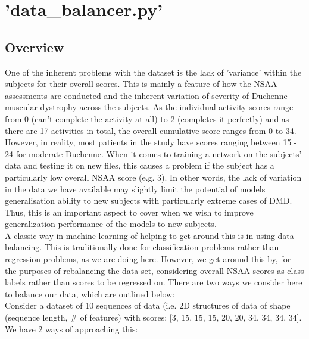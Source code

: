 \documentclass[12pt,twoside]{report}
\begin{document}
\section{'data\_balancer.py'}

\subsection{Overview}

\quad One of the inherent problems with the dataset is the lack of 'variance' within the subjects for their overall scores. This is mainly a feature of how the NSAA assessments are conducted and the inherent variation of severity of Duchenne muscular dystrophy across the subjects. As the individual activity scores range from 0 (can't complete the activity at all) to 2 (completes it perfectly) and as there are 17 activities in total, the overall cumulative score ranges from 0 to 34. However, in reality, most patients in the study have scores ranging between 15 - 24 for moderate Duchenne. When it comes to training a network on the subjects' data and testing it on new files, this causes a problem if the subject has a particularly low overall NSAA score (e.g. 3). In other words, the lack of variation in the data we have available may slightly limit the potential of models generalisation ability to new subjects with particularly extreme cases of DMD. Thus, this is an important aspect to cover when we wish to improve generalization performance of the models to new subjects.\\

\quad A classic way in machine learning of helping to get around this is in using data balancing. This is traditionally done for classification problems rather than regression problems, as we are doing here. However, we get around this by, for the purposes of rebalancing the data set, considering overall NSAA scores as class labels rather than scores to be regressed on. There are two ways we consider here to balance our data, which are outlined below:\\

\quad Consider a dataset of 10 sequences of data (i.e. 2D structures of data of shape (sequence length, \# of features) with scores: [3, 15, 15, 15, 20, 20, 34, 34, 34, 34]. We have 2 ways of approaching this:
\end{document}
